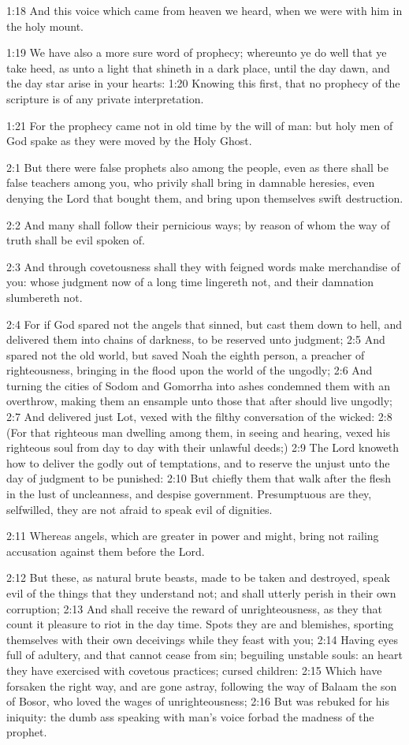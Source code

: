 1:18 And this voice which came from heaven we heard, when we were with
him in the holy mount.

1:19 We have also a more sure word of prophecy; whereunto ye do well
that ye take heed, as unto a light that shineth in a dark place, until
the day dawn, and the day star arise in your hearts: 1:20 Knowing this
first, that no prophecy of the scripture is of any private
interpretation.

1:21 For the prophecy came not in old time by the will of man: but
holy men of God spake as they were moved by the Holy Ghost.

2:1 But there were false prophets also among the people, even as there
shall be false teachers among you, who privily shall bring in damnable
heresies, even denying the Lord that bought them, and bring upon
themselves swift destruction.

2:2 And many shall follow their pernicious ways; by reason of whom the
way of truth shall be evil spoken of.

2:3 And through covetousness shall they with feigned words make
merchandise of you: whose judgment now of a long time lingereth not,
and their damnation slumbereth not.

2:4 For if God spared not the angels that sinned, but cast them down
to hell, and delivered them into chains of darkness, to be reserved
unto judgment; 2:5 And spared not the old world, but saved Noah the
eighth person, a preacher of righteousness, bringing in the flood upon
the world of the ungodly; 2:6 And turning the cities of Sodom and
Gomorrha into ashes condemned them with an overthrow, making them an
ensample unto those that after should live ungodly; 2:7 And delivered
just Lot, vexed with the filthy conversation of the wicked: 2:8 (For
that righteous man dwelling among them, in seeing and hearing, vexed
his righteous soul from day to day with their unlawful deeds;) 2:9 The
Lord knoweth how to deliver the godly out of temptations, and to
reserve the unjust unto the day of judgment to be punished: 2:10 But
chiefly them that walk after the flesh in the lust of uncleanness, and
despise government. Presumptuous are they, selfwilled, they are not
afraid to speak evil of dignities.

2:11 Whereas angels, which are greater in power and might, bring not
railing accusation against them before the Lord.

2:12 But these, as natural brute beasts, made to be taken and
destroyed, speak evil of the things that they understand not; and
shall utterly perish in their own corruption; 2:13 And shall receive
the reward of unrighteousness, as they that count it pleasure to riot
in the day time. Spots they are and blemishes, sporting themselves
with their own deceivings while they feast with you; 2:14 Having eyes
full of adultery, and that cannot cease from sin; beguiling unstable
souls: an heart they have exercised with covetous practices; cursed
children: 2:15 Which have forsaken the right way, and are gone astray,
following the way of Balaam the son of Bosor, who loved the wages of
unrighteousness; 2:16 But was rebuked for his iniquity: the dumb ass
speaking with man's voice forbad the madness of the prophet.

